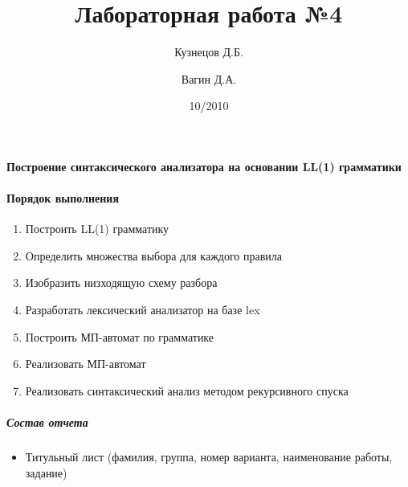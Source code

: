 \documentclass[a4paper,12pt]{article}
\title{Лабораторная работа №4}
\author{Кузнецов Д.Б.\and Вагин Д.А.}
\date{10/2010}
\begin{document}
\paragraph{Построение синтаксического анализатора на основании LL(1) грамматики}

\paragraph{Порядок выполнения}
\begin{enumerate}
	\item Построить LL(1) грамматику
	\item Определить множества выбора для каждого правила
	\item Изобразить низходящую схему разбора
	\item Разработать лексический анализатор на базе lex
	\item Построить МП-автомат по грамматике
	\item Реализовать МП-автомат
	\item Реализовать синтаксический анализ методом рекурсивного спуска	
\end{enumerate}

\subparagraph{Состав отчета}
\begin{itemize}
	\item Титульный лист (фамилия, группа, номер варианта, наименование работы, задание)
\end{itemize}
\end{document}
